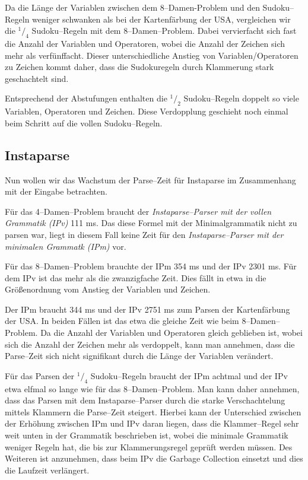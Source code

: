 \documentclass[ngerman,a4paper,abstracton,open=right,twoside=false,toc=listofnumbered,bibtotocnumbered]{scrreprt}
\begin{document}
Da die Länge der Variablen zwischen dem 8--Damen-Problem und den Sudoku--Regeln weniger schwanken als bei der Kartenfärbung der USA, vergleichen wir die $^1/_4$ Sudoku--Regeln mit dem 8--Damen--Problem. Dabei vervierfacht sich fast die Anzahl der Variablen und Operatoren, wobei die Anzahl der Zeichen sich mehr als verfünffacht. Dieser unterschiedliche Anstieg von Variablen/Operatoren zu Zeichen kommt daher, dass die Sudokuregeln durch Klammerung stark geschachtelt sind.

Entsprechend der Abstufungen enthalten die $^1/_2$ Sudoku--Regeln doppelt so viele Variablen, Operatoren und Zeichen. Diese Verdopplung geschieht noch einmal beim Schritt auf die vollen Sudoku--Regeln.

\subsection{Instaparse}

Nun wollen wir das Wachstum der Parse--Zeit für Instaparse im Zusammenhang mit der Eingabe betrachten.

Für das 4--Damen--Problem braucht der \emph{Instaparse--Parser mit der vollen Grammatik (IPv)} 111 ms. Das diese Formel mit der Minimalgrammatik nicht zu parsen war, liegt in diesem Fall keine Zeit für den \emph{Instaparse--Parser mit der minimalen Grammatk (IPm)} vor.

Für das 8--Damen--Problem brauchte der IPm 354 ms und der IPv 2301 ms. Für dem IPv ist das mehr als die zwanzigfache Zeit. Dies fällt in etwa in die Größenordnung vom Anstieg der Variablen und Zeichen.

Der IPm braucht 344 ms und der IPv 2751 ms zum Parsen der Kartenfärbung der USA. In beiden Fällen ist das etwa die gleiche Zeit wie beim 8--Damen--Problem. Da die Anzahl der Variablen und Operatoren gleich geblieben ist, wobei sich die Anzahl der Zeichen mehr als verdoppelt, kann man annehmen, dass die Parse--Zeit sich nicht signifikant durch die Länge der Variablen verändert.

Für das Parsen der $^1/_4$ Sudoku--Regeln braucht der IPm achtmal und der IPv etwa elfmal so lange wie für das 8--Damen--Problem. Man kann daher annehmen, dass das Parsen mit dem Instaparse--Parser durch die starke Verschachtelung mittels Klammern die Parse--Zeit steigert. Hierbei kann der Unterschied zwischen der Erhöhung zwischen IPm und IPv daran liegen, dass die Klammer--Regel sehr weit unten in der Grammatik beschrieben ist, wobei die minimale Grammatik weniger Regeln hat, die bis zur Klammerungsregel geprüft werden müssen. Des Weiteren ist anzunehmen, dass beim IPv die Garbage Collection einsetzt und dies die Laufzeit verlängert.
\end{document}
